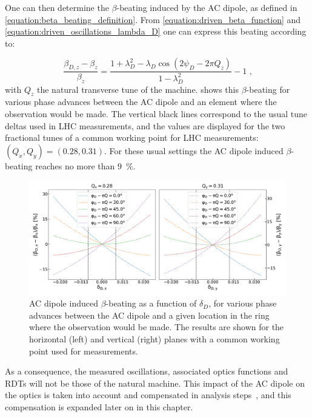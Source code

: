 One can then determine the \(\beta\)-beating induced by the AC dipole, as defined in \cref{equation:beta_beating_definition}.
From \cref{equation:driven_beta_function} and \cref{equation:driven_oscillations_lambda_D} one can express this beating according to:

\begin{equation}
  \frac{\beta_{D,z} - \beta_z}{\beta_z} = \frac{1 + \lambda_D^2 - \lambda_D \cos \left(2 \psi_D - 2 \pi Q_z\right)}{1 - \lambda_D^2} - 1 \text{ ,}
  \label{equation:ac_dipole_beta_beating}
\end{equation}
with \(Q_z\) the natural transverse tune of the machine.
 shows this \(\beta\)-beating for various phase advances between the AC dipole and an element where the observation would be made.
The vertical black lines correspond to the usual tune deltas used in LHC measurements, and the values are displayed for the two fractional tunes of a common working point for LHC measurements: \((Q_x, Q_y) = (0.28, 0.31)\).
For these usual settings the AC dipole induced \(\beta\)-beating reaches no more than \qty{9}{\percent}.

\begin{figure}[!htb]
  \centering
  \includegraphics*[width=0.99\linewidth]{Figures/Optics_Measurements_Corrections_at_LHC/bbeatings_acdipole.pdf}
  \caption{AC dipole induced \(\beta\)-beating as a function of \(\delta_D\), for various phase advances between the AC dipole and a given location in the ring where the observation would be made. The results are shown for the horizontal (left) and vertical (right) planes with a common working point used for measurements.}
  \label{figure:ac_dipole_induced_beta_beating}
\end{figure}

As a consequence, the measured oscillations, associated optics functions and \glspl{RDT} will not be those of the natural machine.
This impact of the AC dipole on the optics is taken into account and compensated in analysis steps~\cite{IPAC:Miyamoto:Measurement_Coupling_RDTs_LHC_AC_Dipole}, and this compensation is expanded later on in this chapter.

